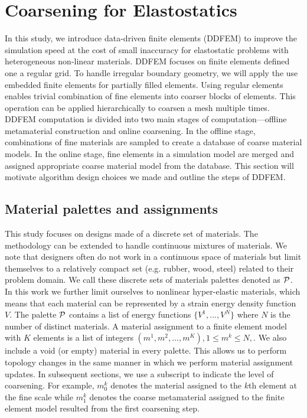 \section{Coarsening for Elastostatics}
In this study, we introduce data-driven finite elements (DDFEM) to 
improve the simulation speed at the cost of small inaccuracy for elastostatic problems with heterogeneous non-linear materials. DDFEM focuses on finite elements defined one a regular grid.
To handle irregular boundary geometry, we will apply the use embedded finite elements for partially filled elements.
Using regular elements enables trivial combination of fine elements into coarser blocks of elements. This operation can be applied hierarchically to coarsen a mesh multiple times.
DDFEM computation is divided into two main stages of computation---offline metamaterial construction and online coarsening.
In the offline stage, combinations of fine materials are sampled to create a database of
coarse material models. In the online stage, fine elements in a simulation model are merged and assigned appropriate coarse material model from the database.
This section will motivate algorithm design choices we made and outline the steps of DDFEM.

\subsection{Material palettes and assignments}
This study focuses on designs made of a discrete set of materials. The methodology can be extended to handle continuous mixtures of materials.
We note that designers often do not work in a continuous space of materials but limit themselves to a relatively compact set (e.g. rubber, wood, steel) related to their problem domain. We call these discrete sets of materials palettes denoted as $\mathcal{P}$. In this work we further limit ourselves to nonlinear hyper-elastic materials, which means that each material can be represented by a strain energy density function $V$. The palette $\mathcal{P}$ contains a list of energy functions $\{V^1,...,V^N\}$ where $N$ is the number of distinct materials.
A material assignment to a finite element model with $K$ elements is a list of integers $(m^1,m^2,...,m^K), 1\leq m^k\leq N,$.
We also include a void (or empty) material in every palette. This allows us to perform topology changes in the same manner in which we perform material assignment updates.
In subsequent sections, we use a subscript to indicate the level of coarsening. For example, $m_0^k$ denotes the material assigned to the $k$th element at the fine scale while $m_1^k$ denotes the coarse metamaterial assigned to the finite element model resulted from the first coarsening step.


